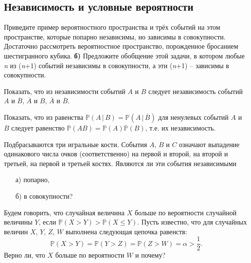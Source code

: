 \subsection{Независимость и условные вероятности}

\begin{problem}
Приведите пример вероятностного пространства и трёх событий на этом пространстве, которые попарно независимы, но зависимы в совокупности. Достаточно рассмотреть вероятностное пространство, порожденное бросанием шестигранного кубика. \textbf{б) }Предложите обобщение этой задачи, в котором любые \textit{n} из (\textit{n}+1) событий независимы в совокупности, а эти (\textit{n}+1) -- зависимы в совокупности.
\end{problem}



\begin{problem}
Показать, что из независимости событий $A$ и $B$ следует независимость событий $A$ и $\overline B$, $\overline A$ и $B$, 
$\overline A$ и $\overline B$. 
\end{problem}


\begin{problem}
Показать, что из равенства ${\mathbb P}(A\, |\, B)={\mathbb P}(A\, |\, \overline B)$ для ненулевых событий $A$ и $B$ следует 
равенство ${\mathbb P}(AB)={\mathbb P}(A){\mathbb P}(B)$, т.е. их независимость. 
\end{problem}


\begin{problem}
Подбрасываются три игральные кости. События $A$, $B$ и $C$ означают выпадение одинакового числа очков (соответственно) на первой и 
второй, на второй и третьей, на первой и третьей костях. Являются ли эти события независимыми 
\begin{enumerate}
\item[а)] попарно, 
\item[б)] в совокупности? 
\end{enumerate}
\end{problem}


\begin{problem}
Будем говорить, что случайная величина $X$ больше по вероятности случайной величины $Y$, если ${\mathbb P}(X>Y)>{\mathbb P}(X\le Y)$. 
Пусть известно, что для случайных величин $X$, $Y$, $Z$, $W$ выполнена следующая цепочка равенств: 
$$
{\mathbb P}(X>Y)={\mathbb P}(Y>Z)={\mathbb P}(Z>W)=\alpha>\frac{1}{2} . 
$$
Верно ли, что $X$ больше по вероятности $W$ и почему? 
\end{problem}



